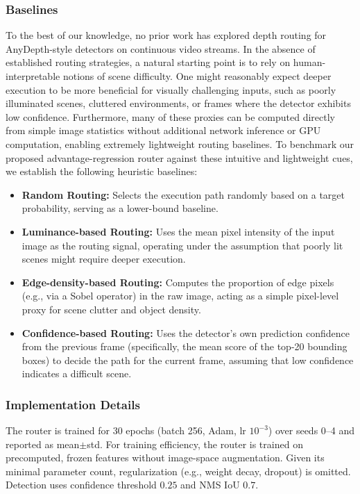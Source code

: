 \subsubsection{Baselines}
\label{sec:setup_baselines}

To the best of our knowledge, no prior work has explored depth routing for AnyDepth-style detectors on continuous video streams. 
In the absence of established routing strategies, a natural starting point is to rely on human-interpretable notions of scene difficulty. 
One might reasonably expect deeper execution to be more beneficial for visually challenging inputs, such as poorly illuminated scenes, cluttered environments, or frames where the detector exhibits low confidence. 
Furthermore, many of these proxies can be computed directly from simple image statistics without additional network inference or GPU computation, enabling extremely lightweight routing baselines.
To benchmark our proposed advantage-regression router against these intuitive and lightweight cues, we establish the following heuristic baselines:
\begin{itemize}
    \item \textbf{Random Routing:} Selects the execution path randomly based on a target probability, serving as a lower-bound baseline.
    \item \textbf{Luminance-based Routing:} Uses the mean pixel intensity of the input image as the routing signal, operating under the assumption that poorly lit scenes might require deeper execution.
    \item \textbf{Edge-density-based Routing:} Computes the proportion of edge pixels (e.g., via a Sobel operator) in the raw image, acting as a simple pixel-level proxy for scene clutter and object density.
    \item \textbf{Confidence-based Routing:} Uses the detector's own prediction confidence from the previous frame (specifically, the mean score of the top-20 bounding boxes) to decide the path for the current frame, assuming that low confidence indicates a difficult scene.
\end{itemize}



\subsubsection{Implementation Details}
\label{sec:setup_impl}
The router is trained for 30 epochs (batch 256, Adam, lr $10^{-3}$) over seeds 0--4
and reported as mean$\pm$std. 
For training efficiency, the router is trained on precomputed, frozen features without image-space augmentation. 
Given its minimal parameter count, regularization (e.g., weight decay, dropout) is omitted.
Detection uses confidence threshold $0.25$ and NMS IoU $0.7$.


